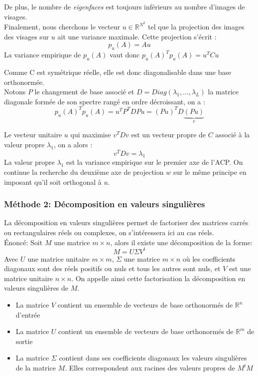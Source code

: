 \documentclass[12pt,french]{article}
\theoremstyle{plain}
\theoremstyle{definition}
\begin{document}
De plus, le nombre de \emph{eigenfaces} est toujours inférieurs au nombre d'images de visages.\\

Finalement, nous cherchons le vecteur $u \in \mathbb{R}^{N^2}$ tel que la projection des images des visages sur $u$ ait une variance maximale. Cette projection s'écrit :
\[
  p_u(A)=Au
\]
La variance empirique de $p_u(A)$ vaut donc $p_u(A)^T p_u(A) = u^T C u$

Comme C est symétrique réelle, elle est donc diagonalisable dans une base orthonormée.\\
Notons $P$ le changement de base associé et $D = Diag(\lambda_1, \dots, \lambda_L)$ la matrice diagonale formée de son spectre rangé en ordre décroissant, on a :
\[
  p_u(A)^T p_u(A) = u^T P^T D P u = (Pu)^T D \underbrace{(Pu)}_v
\]

Le vecteur unitaire $u$ qui maximise $v^T D v$  est un vecteur propre de $C$ associé à la valeur propre $\lambda_1$, on a alors :
\[
  v^T D v = \lambda_1
\]
La valeur propre $\lambda_1$ est la variance empirique sur le premier axe de l'ACP.
On continue la recherche du deuxième axe de projection $w$ sur le même principe en imposant qu'il soit orthogonal à $u$.
\subsubsection{Méthode 2: Décomposition en valeurs singulières}

La décomposition en valeurs singulières permet de factoriser des matrices carrés ou rectangulaires réels ou complexes, on s'intéressera ici au cas réels. \\
Énoncé: Soit $M$ une matrice $m \times n$, alors il existe une décomposition de la forme: \\
$$M=U\Sigma V^t$$
Avec $U$ une matrice unitaire $m \times m$, $\Sigma$ une matrice $m\times n$ où les coefficients diagonaux sont des réels positifs ou nuls et tous les autres sont nuls, et $V$ est une matrice unitaire $n \times n$. On appelle ainsi cette factorisation la décomposition en valeurs singulières de $M$.
\begin{itemize}
\item La matrice $V$ contient un ensemble de vecteurs de base orthonormés de $\mathbb{R}^n$ d'entrée
\item La matrice $U$ contient un ensemble de vecteurs de base orthonormés de $\mathbb{R}^m$ de sortie
\item La matrice $\Sigma$ contient dans ses coefficients diagonaux les valeurs singulières de la matrice $M$. Elles correspondent aux racines des valeurs propres de $M^t M$
\end{itemize}
\end{document}
